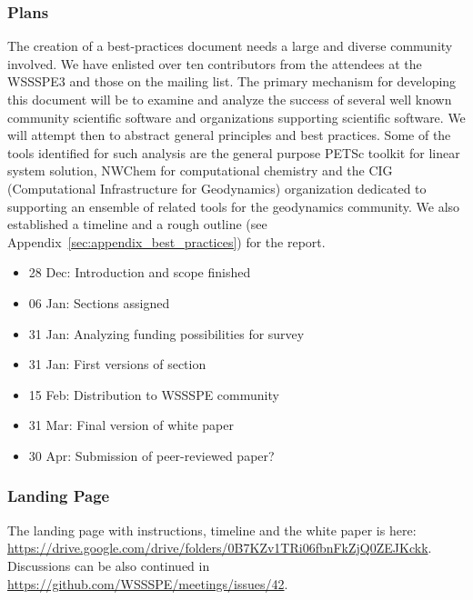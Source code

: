 \subsubsection{Plans}
The creation of a best-practices document needs a large and diverse community
involved. We have enlisted over ten contributors from the attendees at the
WSSSPE3 and those on the mailing list. The primary mechanism for developing this
document will be to examine and analyze the success of several well known
community scientific software and organizations supporting scientific software.
We will attempt then to abstract general principles and best practices. Some of
the tools identified for such analysis are the general purpose PETSc toolkit for
linear system solution, NWChem for computational chemistry and the CIG
(Computational Infrastructure for Geodynamics) organization dedicated to
supporting an ensemble of related tools for the geodynamics community. We also
established a timeline and a rough outline (see
Appendix~\ref{sec:appendix_best_practices}) for the report.

\medskip
{}
\begin{itemize}
%
\item 28 Dec: Introduction and scope finished
\item 06 Jan: Sections assigned
\item 31 Jan: Analyzing funding possibilities for survey
\item 31 Jan: First versions of section
\item 15 Feb: Distribution to WSSSPE community
\item 31 Mar: Final version of white paper
\item 30 Apr: Submission of peer-reviewed paper?
\end{itemize}


\subsubsection{Landing Page}
The landing page with instructions, timeline and the white paper is here: \url{https://drive.google.com/drive/folders/0B7KZv1TRi06fbnFkZjQ0ZEJKckk}.
Discussions can be also continued in \url{https://github.com/WSSSPE/meetings/issues/42}.
